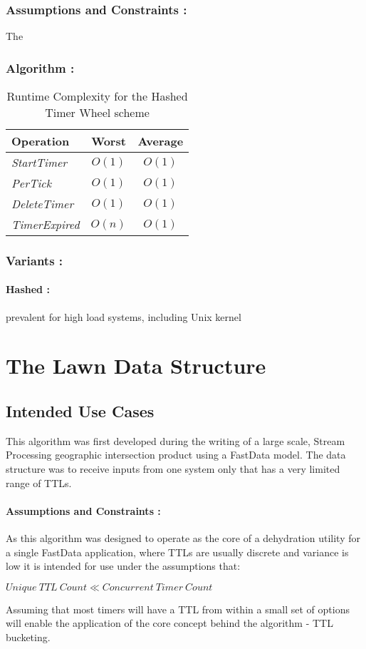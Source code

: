 \documentclass[twocolumn,a4paper]{article}
\newcommand{\advcomplexity}[9]{
\begin{table}[h!]
	\begin{center}
		\begin{tabular}{l|c|c}
			\textbf{Operation} & \textbf{Worst} & \textbf{Average} \\
			\hline
			\textit{StartTimer} & $O(#1)$ & $O(#2)$ \\
			\textit{PerTick} & $O(#3)$ & $O(#4)$ \\
			\textit{DeleteTimer} & $O(#5)$ & $O(#6)$ \\
			\textit{TimerExpired} & $O(#7)$ & $O(#8)$ \\
		\end{tabular}
		\caption{Runtime Complexity for #9 scheme}
		\label{tab:table1}
	\end{center}
\end{table}
}
\begin{document}
\subsubsection{Assumptions and Constraints :}

The 

\subsubsection{Algorithm :}


\advcomplexity{1}{1}{1}{1}{1}{1}{n}{1}{the Hashed Timer Wheel}


\subsubsection{Variants :}

\paragraph{Hashed :}
prevalent for high load systems, including Unix kernel



\section{The Lawn Data Structure}
 
\subsection{Intended Use Cases}

This algorithm was first developed during the writing of a large scale, Stream Processing geographic intersection product using a FastData\cite{GP} model. The data structure was to receive inputs from one system only that has a very limited range of TTLs. 

\paragraph{Assumptions and Constraints :}
As this algorithm was designed to operate as the core of a dehydration utility for a single  FastData application, where TTLs are usually discrete and variance is low it is intended for use under the assumptions that: 
\begin{center}
	$ Unique\ TTL\ Count \ll Concurrent\ Timer\ Count $
\end{center}
Assuming that most timers will have a TTL from within a small set of options will enable the application of the core concept behind the algorithm - TTL bucketing. 
\end{document}
